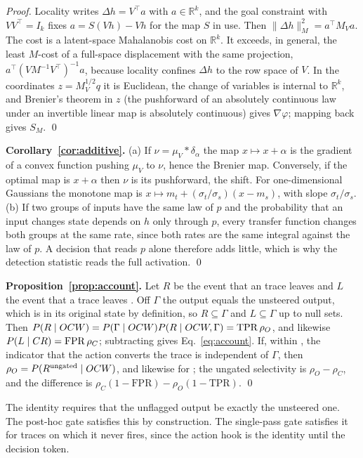 \emph{Proof.} Locality writes $\Delta h=V^\top a$ with $a\in\mathbb{R}^k$, and
the goal constraint with $VV^\top=I_k$ fixes $a=S(Vh)-Vh$ for the map $S$ in
use. Then $\lVert\Delta h\rVert_M^2=a^\top M_Va$. The cost is a latent-space
Mahalanobis cost on $\mathbb{R}^k$. It exceeds, in general, the least
$M$-cost of a full-space displacement with the same projection,
$a^\top(VM^{-1}V^\top)^{-1}a$, because locality confines $\Delta h$ to the row
space of $V$. In the coordinates
$z=M_V^{1/2}q$ it is Euclidean, the change of variables is internal to
$\mathbb{R}^k$, and Brenier's theorem in $z$ (the pushforward of an absolutely
continuous law under an invertible linear map is absolutely continuous) gives
$\nabla\varphi$; mapping back gives $S_M$. \qed

\textbf{Corollary~\ref{cor:additive}.} (a) If $\nu=\mu_V*\delta_\alpha$ the
map $x\mapsto x+\alpha$ is the gradient of a convex function pushing $\mu_V$
to $\nu$, hence the Brenier map. Conversely, if the optimal map is
$x+\alpha$ then $\nu$ is its pushforward, the shift. For one-dimensional
Gaussians the monotone map is $x\mapsto m_t+(\sigma_t/\sigma_s)(x-m_s)$, with
slope $\sigma_t/\sigma_s$. (b) If two groups of inputs have the same law of $p$
and the probability that an input changes state depends on $h$ only through
$p$, every transfer function changes both groups at the same rate, since both
rates are the same integral against the law of $p$. A decision that reads $p$
alone therefore adds little, which is why the detection statistic reads the
full activation. \qed

\textbf{Proposition~\ref{prop:account}.} Let $R$ be the event that an \ocw{}
trace leaves \ocw{} and $L$ the event that a \crok{} trace leaves \crok{}. Off
$\Gamma$ the output equals the unsteered output, which is in its original state
by definition, so $R\subseteq\Gamma$ and $L\subseteq\Gamma$ up to null sets.
Then $P(R\mid OCW)=P(\Gamma\mid OCW)P(R\mid OCW,\Gamma)=\mathrm{TPR}\,\rho_O$, and
likewise $P(L\mid CR)=\mathrm{FPR}\,\rho_C$; subtracting gives
Eq.~\eqref{eq:account}. If, within \ocw{}, the indicator that the action
converts the trace is independent of $\Gamma$, then
$\rho_O=P(R^{\mathrm{ungated}}\mid OCW)$, and likewise for \crok{}; the ungated
selectivity is $\rho_O-\rho_C$, and the difference is
$\rho_C(1-\mathrm{FPR})-\rho_O(1-\mathrm{TPR})$. \qed

The identity requires that the unflagged output be exactly the unsteered one.
The post-hoc gate satisfies this by construction. The single-pass gate
satisfies it for traces on which it never fires, since the action hook is the
identity until the decision token.

